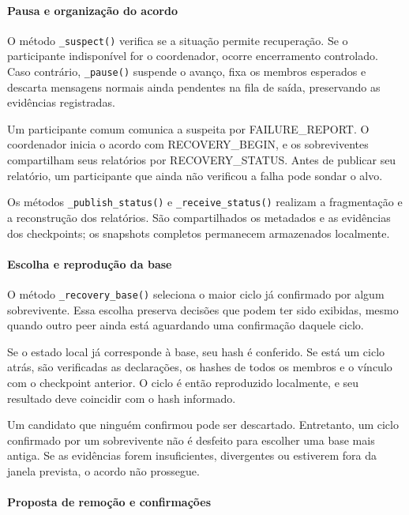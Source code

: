 \documentclass[11pt,a4paper]{article}
\begin{document}
\paragraph{Pausa e organização do acordo}

O método \texttt{\_suspect()} verifica se a situação permite recuperação. Se o participante indisponível for o coordenador, ocorre encerramento controlado. Caso contrário, \texttt{\_pause()} suspende o avanço, fixa os membros esperados e descarta mensagens normais ainda pendentes na fila de saída, preservando as evidências registradas.

Um participante comum comunica a suspeita por FAILURE\_REPORT. O coordenador inicia o acordo com RECOVERY\_BEGIN, e os sobreviventes compartilham seus relatórios por RECOVERY\_STATUS. Antes de publicar seu relatório, um participante que ainda não verificou a falha pode sondar o alvo.

Os métodos \texttt{\_publish\_status()} e \texttt{\_receive\_status()} realizam a fragmentação e a reconstrução dos relatórios. São compartilhados os metadados e as evidências dos checkpoints; os snapshots completos permanecem armazenados localmente.

\paragraph{Escolha e reprodução da base}

O método \texttt{\_recovery\_base()} seleciona o maior ciclo já confirmado por algum sobrevivente. Essa escolha preserva decisões que podem ter sido exibidas, mesmo quando outro peer ainda está aguardando uma confirmação daquele ciclo.

Se o estado local já corresponde à base, seu hash é conferido. Se está um ciclo atrás, são verificadas as declarações, os hashes de todos os membros e o vínculo com o checkpoint anterior. O ciclo é então reproduzido localmente, e seu resultado deve coincidir com o hash informado.

Um candidato que ninguém confirmou pode ser descartado. Entretanto, um ciclo confirmado por um sobrevivente não é desfeito para escolher uma base mais antiga. Se as evidências forem insuficientes, divergentes ou estiverem fora da janela prevista, o acordo não prossegue.

\paragraph{Proposta de remoção e confirmações}
\end{document}
